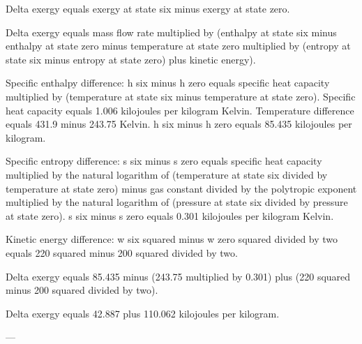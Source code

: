 Delta exergy equals exergy at state six minus exergy at state zero.  

Delta exergy equals mass flow rate multiplied by (enthalpy at state six minus enthalpy at state zero minus temperature at state zero multiplied by (entropy at state six minus entropy at state zero) plus kinetic energy).  

Specific enthalpy difference:  
h six minus h zero equals specific heat capacity multiplied by (temperature at state six minus temperature at state zero).  
Specific heat capacity equals 1.006 kilojoules per kilogram Kelvin.  
Temperature difference equals 431.9 minus 243.75 Kelvin.  
h six minus h zero equals 85.435 kilojoules per kilogram.  

Specific entropy difference:  
s six minus s zero equals specific heat capacity multiplied by the natural logarithm of (temperature at state six divided by temperature at state zero) minus gas constant divided by the polytropic exponent multiplied by the natural logarithm of (pressure at state six divided by pressure at state zero).  
s six minus s zero equals 0.301 kilojoules per kilogram Kelvin.  

Kinetic energy difference:  
w six squared minus w zero squared divided by two equals 220 squared minus 200 squared divided by two.  

Delta exergy equals 85.435 minus (243.75 multiplied by 0.301) plus (220 squared minus 200 squared divided by two).  

Delta exergy equals 42.887 plus 110.062 kilojoules per kilogram.  

---